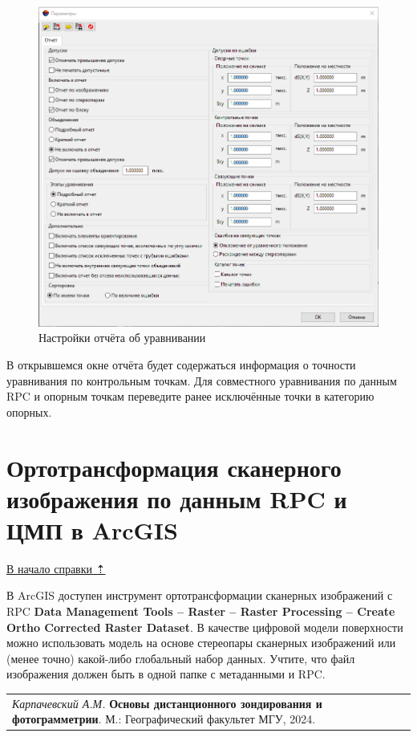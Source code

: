 \documentclass[
  12pt,
]{book}
\begin{document}
\begin{figure}
\centering
\includegraphics{images/Ref17/Report_Settings.png}
\caption{Настройки отчёта об уравнивании}
\end{figure}

В открывшемся окне отчёта будет содержаться информация о точности уравнивания по контрольным точкам. Для совместного уравнивания по данным RPC и опорным точкам переведите ранее исключённые точки в категорию опорных.

\hypertarget{rpc-orthorectification}{%
\section{Ортотрансформация сканерного изображения по данным RPC и ЦМП в ArcGIS}\label{rpc-orthorectification}}

\protect\hyperlink{rpc}{В начало справки ⇡}

В ArcGIS доступен инструмент ортотрансформации сканерных изображений с RPC \textbf{Data Management Tools -- Raster -- Raster Processing -- Create Ortho Corrected Raster Dataset}. В качестве цифровой модели поверхности можно использовать модель на основе стереопары сканерных изображений или (менее точно) какой-либо глобальный набор данных. Учтите, что файл изображения должен быть в одной папке с метаданными и RPC.

\begin{longtable}[]{@{}l@{}}
\toprule\noalign{}
\endhead
\bottomrule\noalign{}
\endlastfoot
\emph{Карпачевский А.М.} \textbf{Основы дистанционного зондирования и фотограмметрии}. М.: Географический факультет МГУ, 2024. \\
\end{longtable}
\end{document}
